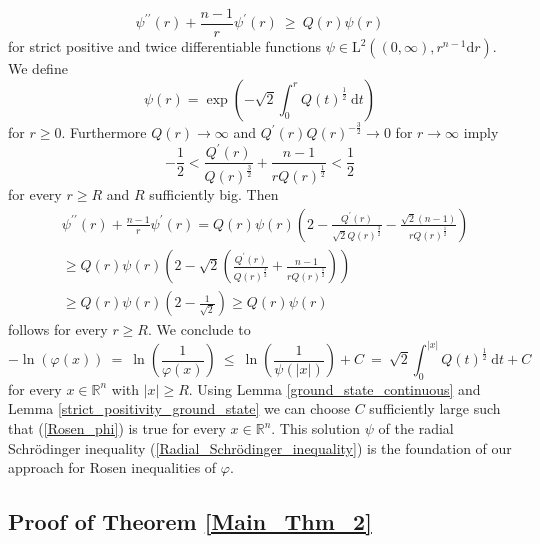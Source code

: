 \documentclass[12pt,longbibliography]{article}
\def\R{\mathbb{R}}
\theoremstyle{definition}
\theoremstyle{remark}
\theoremstyle{example}
\begin{document}
\begin{equation} \label{Radial_Schrödinger_inequality}
\psi^{\prime \prime}(r) + \frac{n-1}{r} \psi^{\prime}(r) \ \geq \ Q(r)\psi(r)
\end{equation}
for strict positive and twice differentiable functions $\psi \in \mathrm{L}^{2}\left( (0,\infty), r^{n-1} \mathrm{d}r \right)$.
We define
$$
\psi(r) = \exp \left( - \sqrt{2}\int_{0}^{r} Q(t)^{\frac{1}{2}} \ \mathrm{d}t   \right)
$$
for $r \geq 0$. Furthermore $Q(r) \to \infty$ and $Q^{\prime}(r)Q(r)^{-\frac{3}{2}} \to 0$ for $r \to \infty$ imply
$$
-\frac{1}{2} < \frac{Q^{\prime}(r)}{Q(r)^{\frac{3}{2}}} + \frac{n-1}{rQ(r)^{\frac{1}{2}}} < \frac{1}{2}  
$$
for every $r \geq R$ and $R$ sufficiently big. Then
\begin{align*}
& \psi^{\prime \prime}(r) + \frac{n-1}{r} \psi^{\prime}(r) = 
Q(r) \psi(r) \left(  2 -  \frac{Q^{\prime}(r)}{\sqrt{2}Q(r)^{\frac{3}{2}}}  - \frac{\sqrt{2}(n-1)}{rQ(r)^{\frac{1}{2}}}  \right) \\
& \geq Q(r) \psi(r) \left(  2 - \sqrt{2} \left( \frac{Q^{\prime}(r)}{Q(r)^{\frac{3}{2}}} + \frac{n-1}{rQ(r)^{\frac{1}{2}}} \right) \right) \\
& \geq Q(r) \psi(r) \left(  2 - \frac{1}{\sqrt{2}} \right) \geq Q(r) \psi(r) 
\end{align*}
follows for every $r \geq R$. We conclude to
\begin{equation}\label{Rosen_phi}
-\ln \left( \varphi(x) \right) \ = \ \ln \left( \frac{1}{\varphi(x)} \right) \ \leq \ \ln \left( \frac{1}{\psi(|x|)} \right) + C \ = \
\sqrt{2} \int_{0}^{|x|} Q(t)^{\frac{1}{2}} \ \mathrm{d}t + C
\end{equation}
for every $x \in \R^{n}$ with $|x| \geq R$. Using Lemma \ref{ground_state_continuous} and 
Lemma \ref{strict_positivity_ground_state} we can choose $C$ sufficiently large such that (\ref{Rosen_phi}) is true for every 
$x \in \R^{n}$. This solution $\psi$ of the radial Schrödinger inequality 
(\ref{Radial_Schrödinger_inequality}) is the
foundation of our approach for Rosen inequalities of $\varphi$. \\

\subsection{Proof of Theorem \ref{Main_Thm_2}} \label{Proof_Main_Thm_2}
\end{document}
